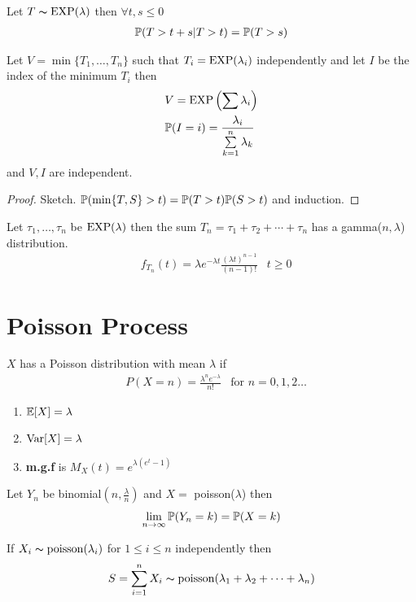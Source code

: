 \documentclass[12pt,a4paper]{article}
\begin{document}
\begin{thm}
Let $T\sim \EXP(\lambda)$ then $\forall t,s\leq 0$
\begin{align*}
\P(T > t+s | T > t) = \P(T > s)
\end{align*}
\end{thm}
\begin{thm}
Let $V = \min\{T_1, \ldots, T_n\}$ such that $T_i = \EXP(\lambda_i)$ independently and let $I$ be the index of the minimum $T_i$ then 
\begin{align*}
&V = \EXP\left(\sum \lambda_i\right)\\
&\P(I = i) = \frac{\lambda_i}{\nsum{k=1}n \lambda_k}
\end{align*}
and $V,I$ are independent. 
\end{thm}
\begin{proof}
Sketch. $\P(\min\{T,S\} > t) = \P(T>t)\P(S>t)$ and induction.
\end{proof}

\begin{thm}
Let $\tau_1, \ldots, \tau_n$ be $\EXP(\lambda)$ then the sum $T_n = \tau_1 + \tau_2 + \cdots + \tau_n$ has a gamma($n, \lambda$) distribution. 
\begin{align*}
&f_{T_n}(t) = \lambda e^{-\lambda t} \frac{(\lambda t)^{n-1}}{(n-1)!} & t \geq 0
\end{align*}
\end{thm}
\newpage
\section{Poisson Process}
\begin{defn}
$X$ has a Poisson distribution with mean $\lambda$ if 
\begin{align*}
&P(X = n) = \frac{\lambda^n e^{-\lambda}}{n!} & \text{for $n = 0,1,2\ldots$}
\end{align*} 
\begin{enumerate}[(1)]
\item $\E[X] = \lambda$
\item $\Var[X] = \lambda$
\item \textbf{m.g.f} is $M_X(t) = e^{\lambda(e^t - 1)}$
\end{enumerate}
\end{defn}

\begin{thm}
Let $Y_n$ be binomial$(n, \frac{\lambda}{n})$ and $X = $ poisson($\lambda$) then 
\begin{align*}
\nlim{n}{\infty}\P(Y_n = k) = \P(X = k)
\end{align*}
\end{thm}
\begin{thm}
If $X_i \sim \poisson(\lambda_i)$ for $1\leq i \leq n$ independently then 
\begin{align*}
S = \nsum{i=1}{n}X_i \sim \poisson(\lambda_1 + \lambda_2 + \cdots + \lambda_n)
\end{align*}
\end{thm}
\end{document}
